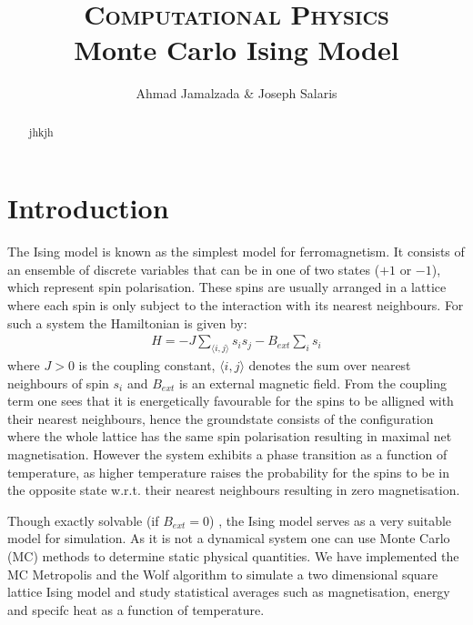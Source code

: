 \documentclass[11pt]{article}
\author{Ahmad Jamalzada \& Joseph Salaris}
\title{\textsc{\Huge Computational Physics}\\Monte Carlo Ising Model}
\begin{document}
\maketitle
\begin{abstract}
jhkjh
\end{abstract}

\newpage

\section{Introduction}
The Ising model is known as the simplest model for ferromagnetism. It consists of an ensemble of discrete variables that  can be in one of two states ($+1$ or $-1$), which represent spin polarisation. These spins are usually arranged in a lattice where each spin is only subject to the interaction with its nearest neighbours. For such a system the Hamiltonian is given by: 
\begin{align}\label{H}
H=-J\sum_{\langle i,j\rangle}s_is_j-B_{ext}\sum_is_i
\end{align}  
where $J>0$ is the coupling constant, $\langle i,j\rangle$ denotes the sum over nearest neighbours of spin $s_i$ and $ B_{ext}$ is an external magnetic field. From the coupling term one sees that it is energetically favourable for the spins to be alligned with their nearest neighbours, hence the groundstate consists of the configuration where the whole lattice has the same spin polarisation resulting in maximal net magnetisation. However the system exhibits a phase transition as a function of temperature, as higher temperature raises the probability for the spins to be in the opposite state w.r.t. their nearest neighbours resulting in zero magnetisation. 

Though exactly solvable (if $B_{ext}=0$) \cite{exact}, the Ising model serves as a very suitable model for simulation. As it is not a dynamical system one can use Monte Carlo (MC) methods to determine static physical quantities. We have implemented the MC Metropolis and the Wolf algorithm to simulate a two dimensional square lattice Ising model and study statistical averages such as magnetisation, energy and specifc heat as a function of temperature.
\end{document}
